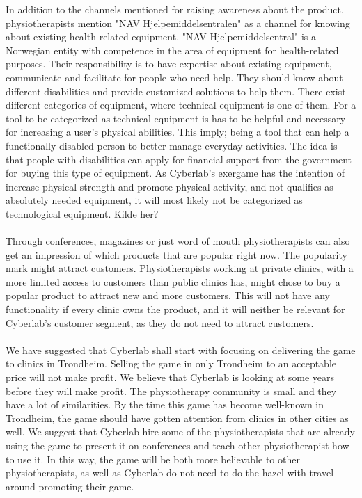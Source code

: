 In addition to the channels mentioned for raising awareness about the product, physiotherapists mention "NAV Hjelpemiddelsentralen" as a channel for knowing about existing health-related equipment. "NAV Hjelpemiddelsentral" is a Norwegian entity with competence in the area of equipment for health-related purposes. Their responsibility is to have expertise about existing equipment, communicate and facilitate for people who need help. They should know about different disabilities and provide customized solutions to help them. There exist different categories of equipment, where technical equipment is one of them. For a tool to be categorized as technical equipment is has to be helpful and necessary for increasing a user’s physical abilities. This imply; being a tool that can help a functionally disabled person to better manage everyday activities. The idea is that people with disabilities can apply for financial support from the government for buying this type of equipment. As Cyberlab’s exergame has the intention of increase physical strength and promote physical activity, and not qualifies as absolutely needed equipment, it will most likely not be categorized as technological equipment. Kilde her?  \\ \\
Through conferences, magazines or just word of mouth physiotherapists can also get an impression of which products that are popular right now. The popularity mark might attract customers. Physiotherapists working at private clinics, with a more limited access to customers than public clinics has, might chose to buy a popular product to attract new and more customers. This will not have any functionality if every clinic owns the product, and it will neither be relevant for Cyberlab’s customer segment, as they do not need to attract customers. \\ \\ 
We have suggested that Cyberlab shall start with focusing on delivering the game to clinics in Trondheim. Selling the game in only Trondheim to an acceptable price will not make profit. We believe that Cyberlab is looking at some years before they will make profit. The physiotherapy community is small and they have a lot of similarities. By the time this game has become well-known in Trondheim, the game should have gotten attention from clinics in other cities as well. We suggest that Cyberlab hire some of the physiotherapists that are already using the game to present it on conferences and teach other physiotherapist how to use it. In this way, the game will be both more believable to other physiotherapists, as well as Cyberlab do not need to do the hazel with travel around promoting their game. \\ \\
